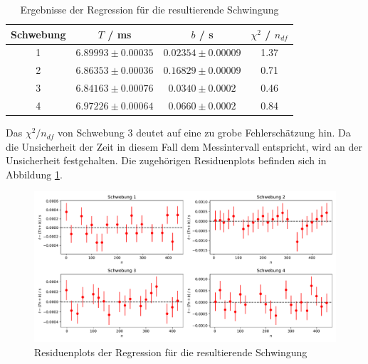 \begin{table}[H]
\centering
\begin{tabular}{c|c|c|c}
Schwebung & $T$ / ms & $b$ / s & $\chi^2$ / $n_{df}$ \\
\hline
1 & $6.89993 \pm 0.00035$ & $0.02354 \pm 0.00009$ & 1.37 \\
2 & $6.86353 \pm 0.00036$ & $0.16829 \pm 0.00009$ & 0.71 \\
3 & $6.84163 \pm 0.00076$ & $0.0340 \pm 0.0002$ & 0.46 \\
4 & $6.97226 \pm 0.00064$ & $0.0660 \pm 0.0002$ & 0.84
\end{tabular}
\caption{Ergebnisse der Regression für die resultierende Schwingung}
\label{tabRegressionRes}
\end{table}
Das $\chi^2/n_{df}$ von Schwebung 3 deutet auf eine zu grobe Fehlerschätzung hin. Da die Unsicherheit der Zeit in diesem Fall dem Messintervall entspricht, wird an der Unsicherheit festgehalten. Die zugehörigen Residuenplots befinden sich in Abbildung \ref{residuenRes}.


\begin{figure}[H]
	\centering
	\includegraphics[width=\linewidth]{plots/residuenRes.pdf}
	\caption{Residuenplots der Regression für die resultierende Schwingung}
	\label{residuenRes}
\end{figure}

